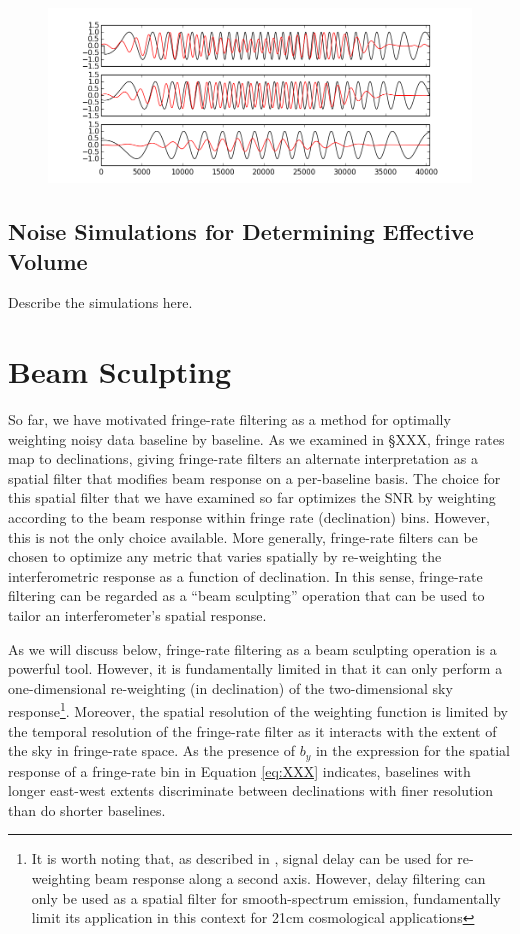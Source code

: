 \documentclass[twocolumn,apj,numberedappendix]{emulateapj}
\begin{document}
\begin{figure}\centering
\includegraphics[width=1.8\columnwidth]{plots/src_track.png}
\caption{
}\label{fig:src_track}
\end{figure}

\subsection{Noise Simulations for Determining Effective Volume}
\label{sec:sim_nos}

Describe the simulations here.

\section{Beam Sculpting}
\label{sec:bmsculpt}

So far, we have motivated fringe-rate filtering as a method for optimally weighting noisy data baseline by baseline.
As we examined in \S XXX, fringe rates map to declinations, giving fringe-rate filters an alternate interpretation
as a spatial filter that modifies beam response on a per-baseline basis.  The choice for this spatial filter that we
have examined so far optimizes the SNR by weighting according to the beam response within fringe rate (declination) bins.  
However, this is not the only choice available.  More generally, fringe-rate filters can be chosen to optimize
any metric that varies spatially by re-weighting the interferometric response as a function of declination.  In this
sense, fringe-rate filtering can be regarded as a ``beam sculpting'' operation that can be used to tailor an interferometer's
spatial response.

As we will discuss below, fringe-rate filtering as a beam sculpting operation is a powerful tool.  However, it
is fundamentally limited in that it can only perform a one-dimensional re-weighting (in declination) of 
the two-dimensional sky response\footnote{It is worth noting that, as described in \citet{parsons_backer2009},
signal delay can be used for re-weighting beam response along a second axis.  However, delay filtering can only
be used as a spatial filter for smooth-spectrum emission, fundamentally limit its application in this
context for 21cm cosmological applications}.  Moreover, the spatial resolution of the weighting function is limited by
the temporal resolution of the fringe-rate filter as it interacts with the extent of the sky in fringe-rate space.
As the presence of $b_y$ in the expression for the spatial response of a fringe-rate bin in Equation \ref{eq:XXX} indicates,
baselines with longer east-west extents discriminate between declinations with finer resolution than do shorter
baselines.
\end{document}
